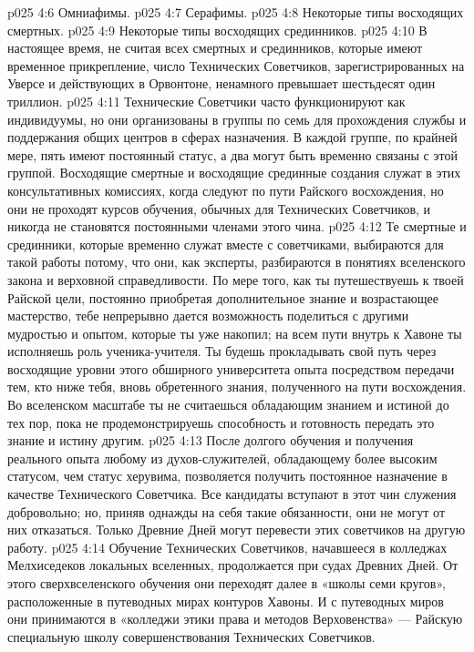 \vs p025 4:6 \bibnobreakspace Омниафимы.
\vs p025 4:7 \bibnobreakspace Серафимы.
\vs p025 4:8 \bibnobreakspace Некоторые типы восходящих смертных.
\vs p025 4:9 \bibnobreakspace Некоторые типы восходящих срединников.
\vs p025 4:10 \pc В настоящее время, не считая всех смертных и срединников, которые имеют временное прикрепление, число Технических Советчиков, зарегистрированных на Уверсе и действующих в Орвонтоне, ненамного превышает шестьдесят один триллион.
\vs p025 4:11 Технические Советчики часто функционируют как индивидуумы, но они организованы в группы по семь для прохождения службы и поддержания общих центров в сферах назначения. В каждой группе, по крайней мере, пять имеют постоянный статус, а два могут быть временно связаны с этой группой. Восходящие смертные и восходящие срединные создания служат в этих консультативных комиссиях, когда следуют по пути Райского восхождения, но они не проходят курсов обучения, обычных для Технических Советчиков, и никогда не становятся постоянными членами этого чина.
\vs p025 4:12 Те смертные и срединники, которые временно служат вместе с советчиками, выбираются для такой работы потому, что они, как эксперты, разбираются в понятиях вселенского закона и верховной справедливости. По мере того, как ты путешествуешь к твоей Райской цели, постоянно приобретая дополнительное знание и возрастающее мастерство, тебе непрерывно дается возможность поделиться с другими мудростью и опытом, которые ты уже накопил; на всем пути внутрь к Хавоне ты исполняешь роль ученика\hyp{}учителя. Ты будешь прокладывать свой путь через восходящие уровни этого обширного университета опыта посредством передачи тем, кто ниже тебя, вновь обретенного знания, полученного на пути восхождения. Во вселенском масштабе ты не считаешься обладающим знанием и истиной до тех пор, пока не продемонстрируешь способность и готовность передать это знание и истину другим.
\vs p025 4:13 После долгого обучения и получения реального опыта любому из духов\hyp{}служителей, обладающему более высоким статусом, чем статус херувима, позволяется получить постоянное назначение в качестве Технического Советчика. Все кандидаты вступают в этот чин служения добровольно; но, приняв однажды на себя такие обязанности, они не могут от них отказаться. Только Древние Дней могут перевести этих советчиков на другую работу.
\vs p025 4:14 \pc Обучение Технических Советчиков, начавшееся в колледжах Мелхиседеков локальных вселенных, продолжается при судах Древних Дней. От этого сверхвселенского обучения они переходят далее в «школы семи кругов», расположенные в путеводных мирах контуров Хавоны. И с путеводных миров они принимаются в «колледжи этики права и методов Верховенства» --- Райскую специальную школу совершенствования Технических Советчиков.
